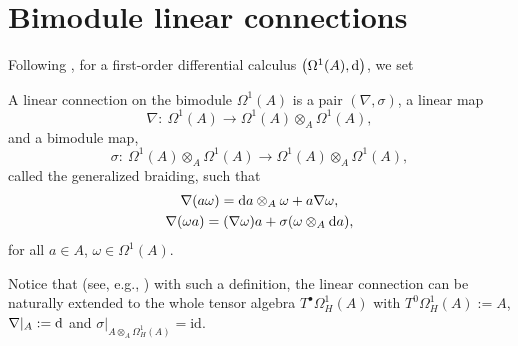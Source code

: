 \documentclass[pdftex]{sigma}
\numberwithin{equation}{section}
\begin{document}
\section{Bimodule linear connections}
Following \cite{BM14}, for a first-order differential calculus $\big(\Omega^1(A),{\rm d}\big)$, we set
\begin{Definition}\label{lincon}
A linear connection on the bimodule $\Omega^1(A)$ is a pair $(\nabla, \sigma)$, a linear map
\begin{equation*}
\nabla\colon \ \Omega^1(A)\rightarrow \Omega^1(A)\otimes_A\Omega^1(A),
\end{equation*}
and a bimodule map,
\begin{equation*}
\sigma\colon \ \Omega^1(A)\otimes_A\Omega^1(A)\rightarrow \Omega^1(A)\otimes_A \Omega^1(A),
\end{equation*}
called the generalized braiding, such that
\begin{gather*}
\nabla(a\omega)={\rm d}a\otimes_A\omega +a\nabla\omega, \nonumber\\
\nabla(\omega a)=(\nabla \omega)a +\sigma (\omega\otimes_A {\rm d}a),%
\end{gather*}
for all $a\in A$, $\omega\in \Omega^1(A)$.
\end{Definition}
Notice that (see, e.g., \cite[Proposition~2.1.3]{BM11}) with such a definition, the linear connection can be naturally extended to the whole tensor algebra $T^\bullet\Omega_H^1(A)$ with $T^0\Omega_H^1(A):=A$, $\nabla|_{A}:={\rm d}$ and $\sigma|_{A\otimes_A \Omega_H^1(A)}=\mathrm{id}$.
\end{document}
